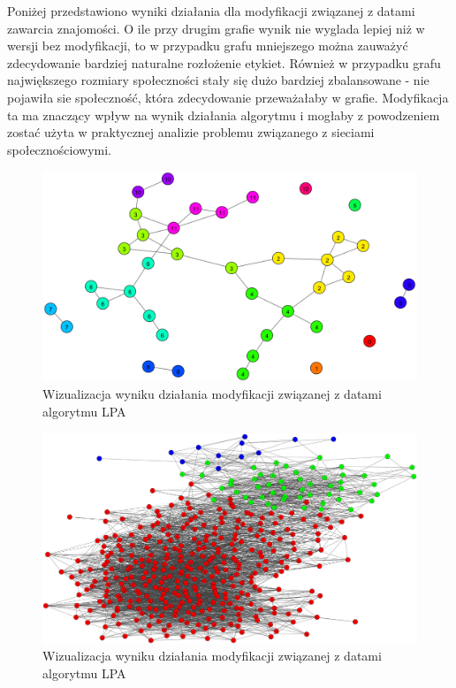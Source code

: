 \documentclass{article}
\begin{document}
Poniżej przedstawiono wyniki działania dla modyfikacji związanej z datami zawarcia znajomości. O ile przy drugim grafie wynik nie wyglada lepiej niż w wersji bez modyfikacji, to w przypadku grafu mniejszego można zauważyć zdecydowanie bardziej naturalne rozłożenie etykiet. Również w przypadku grafu największego rozmiary społeczności stały się dużo bardziej zbalansowane - nie pojawiła sie społeczność, która zdecydowanie przeważałaby w grafie. Modyfikacja ta ma znaczący wpływ na wynik działania algorytmu i mogłaby z powodzeniem zostać użyta w praktycznej analizie problemu związanego z sieciami społecznościowymi.

\begin{figure}[H]
\centering
\includegraphics[width=\textwidth]{images/ms-lpa-m1-0.png}
\caption{Wizualizacja wyniku działania modyfikacji związanej z datami algorytmu LPA} 
\end{figure}

\begin{figure}[H]
\centering
\includegraphics[width=\textwidth]{images/ms-lpa-m1-2.png}
\caption{Wizualizacja wyniku działania modyfikacji związanej z datami algorytmu LPA}
\end{figure}
\end{document}
